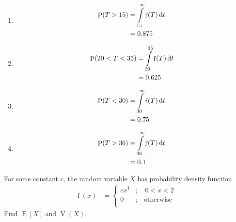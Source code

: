 \documentclass[fleqn, a4paper, 11pt, oneside]{amsart}
\theoremstyle{definition}
\theoremstyle{theorem}
\DeclareMathOperator{\prob}{\mathrm{P}}
\DeclareMathOperator{\expct}{\mathrm{E}}
\DeclareMathOperator{\var}{\mathrm{V}}
\DeclareMathOperator{\pdf}{\mathrm{f}}
\begin{document}
\begin{solution}
	\begin{enumerate}[leftmargin=*]
		\item
			\begin{align*}
				\prob(T > 15) &= \int\limits_{15}^{\infty} \pdf(T) \dif t\\
				&= 0.875
			\end{align*}
		\item
			\begin{align*}
				\prob(20 < T < 35) &= \int\limits_{20}^{35} \pdf(T) \dif t\\
				&= 0.625
			\end{align*}
		\item
			\begin{align*}
				\prob(T < 30) &= \int\limits_{30}^{\infty} \pdf(T) \dif t\\
				&= 0.75
			\end{align*}
		\item
			\begin{align*}
				\prob(T > 36) &= \int\limits_{36}^{\infty} \pdf(T) \dif t\\
				&= 0.1
			\end{align*}
	\end{enumerate}
\end{solution}

\begin{question}
	For some constant $c$, the random variable $X$ has probability density function
	\begin{align*}
		\pdf(x) &=
			\begin{cases}
				c x^4 &;\quad 0 < x < 2\\
				0 &;\quad \text{otherwise}\\
			\end{cases}
	\end{align*}
	Find $\expct[X]$ and $\var(X)$.
\end{question}
\end{document}
